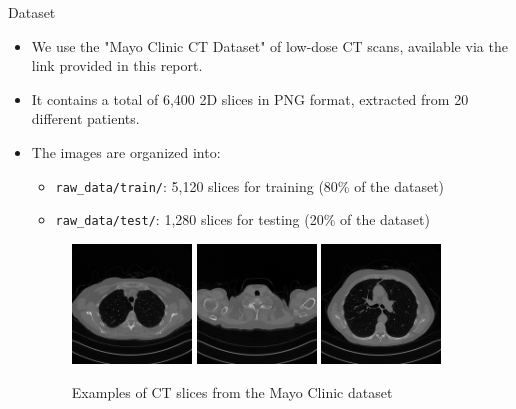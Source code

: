 

\begin{frame}{Dataset}
  \begin{itemize}
    \item We use the "Mayo Clinic CT Dataset" of low-dose CT scans, available via the link provided in this report.
    \item It contains a total of 6,400 2D slices in PNG format, extracted from 20 different patients.
    \item The images are organized into:
      \begin{itemize}
        \item \texttt{raw\_data/train/}: 5,120 slices for training (80\% of the dataset)
        \item \texttt{raw\_data/test/}: 1,280 slices for testing (20\% of the dataset)
      \end{itemize}
 \begin{figure}
    \centering
    \includegraphics[width=0.3\textwidth]{media/2.png}
    \includegraphics[width=0.3\textwidth]{media/3.png}
    \includegraphics[width=0.3\textwidth]{media/100.png}
    \caption{Examples of CT slices from the Mayo Clinic dataset}
  \end{figure}  
  \end{itemize}
\end{frame}

